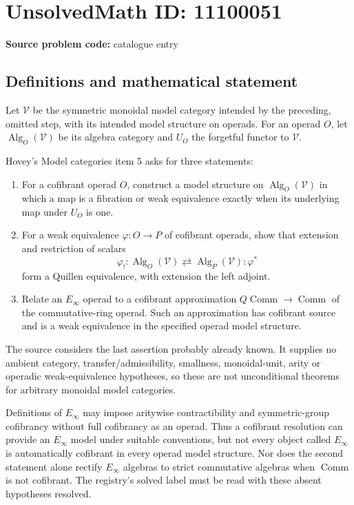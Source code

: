 \documentclass[11pt]{article}
\begin{document}
\section*{UnsolvedMath ID: 11100051}
\textbf{Source problem code:} catalogue entry
\subsection{Definitions and mathematical statement}
Let $\mathcal V$ be the symmetric monoidal model category intended by the preceding, omitted step, with its intended model structure on operads. For an operad $O$, let $\operatorname{Alg}_O(\mathcal V)$ be its algebra category and $U_O$ the forgetful functor to $\mathcal V$.

Hovey's Model categories item 5 asks for three statements:
\begin{enumerate}
\item For a cofibrant operad $O$, construct a model structure on $\operatorname{Alg}_O(\mathcal V)$ in which a map is a fibration or weak equivalence exactly when its underlying map under $U_O$ is one.
\item For a weak equivalence $\varphi:O\to P$ of cofibrant operads, show that extension and restriction of scalars
\[
 \varphi_!:\operatorname{Alg}_O(\mathcal V)
 \rightleftarrows\operatorname{Alg}_P(\mathcal V):\varphi^*
\]
form a Quillen equivalence, with extension the left adjoint.
\item Relate an $E_\infty$ operad to a cofibrant approximation $Q\operatorname{Comm}\to\operatorname{Comm}$ of the commutative-ring operad. Such an approximation has cofibrant source and is a weak equivalence in the specified operad model structure.
\end{enumerate}
The source considers the last assertion probably already known. It supplies no ambient category, transfer/admissibility, smallness, monoidal-unit, arity or operadic weak-equivalence hypotheses, so these are not unconditional theorems for arbitrary monoidal model categories.

Definitions of $E_\infty$ may impose aritywise contractibility and symmetric-group cofibrancy without full cofibrancy as an operad. Thus a cofibrant resolution can provide an $E_\infty$ model under suitable conventions, but not every object called $E_\infty$ is automatically cofibrant in every operad model structure. Nor does the second statement alone rectify $E_\infty$ algebras to strict commutative algebras when $\operatorname{Comm}$ is not cofibrant. The registry's solved label must be read with these absent hypotheses resolved.
\end{document}
